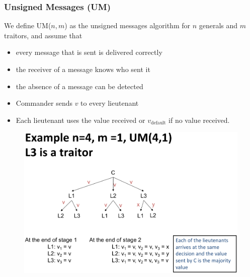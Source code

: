 \documentclass[twocolumn,landscape,10pt]{article}
\theoremstyle{definition}
\begin{document}
\subsubsection{Unsigned Messages (UM)}

We define UM($n,m$) as the unsigned messages algorithm for $n$ generals and $m$
traitors, and assume that
\begin{itemize}
    \item every message that is sent is delivered correctly
    \item the receiver of a message knows who sent it
    \item the absence of a message can be detected
\end{itemize} 

\medskip\noindent
{}

\begin{itemize}
    \item Commander sends $v$ to every lieutenant
    \item Each lieutenant uses the value received or $v_\text{default}$ if no
        value received.
\end{itemize} 

\begin{figure}[h]
  	\includegraphics[scale=0.30]{L3.png}
  	\centering
\end{figure}

\noindent
{}
\end{document}
